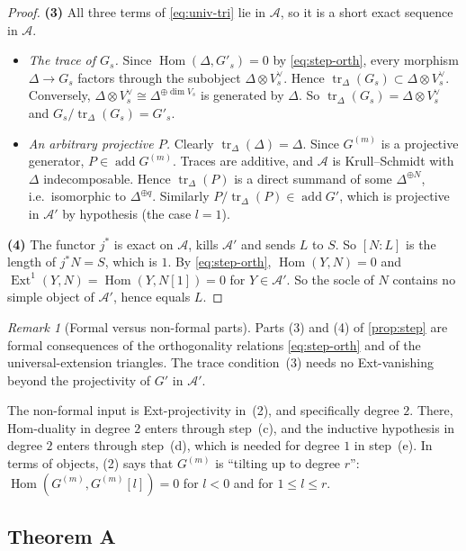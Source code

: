 \documentclass[11pt,reqno]{amsart}
\theoremstyle{plain}
\theoremstyle{definition}
\theoremstyle{remark}
\newtheorem{remark}[theorem]{Remark}
\DeclareMathOperator{\Hom}{Hom}
\DeclareMathOperator{\Ext}{Ext}
\DeclareMathOperator{\add}{add}
\DeclareMathOperator{\tr}{tr}
\newcommand{\cA}{\mathcal{A}}
\begin{document}
\begin{proof}
\textbf{(3)} All three terms of \eqref{eq:univ-tri} lie in $\cA$, so it is a short exact sequence in $\cA$.
\begin{itemize}
\item \emph{The trace of $G_s$.} Since $\Hom(\Delta,G'_s)=0$ by \eqref{eq:step-orth}, every morphism $\Delta\to G_s$ factors through the subobject $\Delta\otimes V_s^\vee$. Hence $\tr_\Delta(G_s)\subset\Delta\otimes V_s^\vee$. Conversely, $\Delta\otimes V_s^\vee\cong\Delta^{\oplus\dim V_s}$ is generated by $\Delta$. So $\tr_\Delta(G_s)=\Delta\otimes V_s^\vee$ and $G_s/\tr_\Delta(G_s)=G'_s$.
\item \emph{An arbitrary projective $P$.} Clearly $\tr_\Delta(\Delta)=\Delta$. Since $G^{(m)}$ is a projective generator, $P\in\add G^{(m)}$. Traces are additive, and $\cA$ is Krull--Schmidt with $\Delta$ indecomposable. Hence $\tr_\Delta(P)$ is a direct summand of some $\Delta^{\oplus N}$, i.e.\ isomorphic to $\Delta^{\oplus q}$. Similarly $P/\tr_\Delta(P)\in\add G'$, which is projective in $\cA'$ by hypothesis (the case $l=1$).
\end{itemize}

\textbf{(4)} The functor $j^*$ is exact on $\cA$, kills $\cA'$ and sends $L$ to $S$. So $[N:L]$ is the length of $j^*N=S$, which is $1$. By \eqref{eq:step-orth}, $\Hom(Y,N)=0$ and $\Ext^1(Y,N)=\Hom(Y,N[1])=0$ for $Y\in\cA'$. So the socle of $N$ contains no simple object of $\cA'$, hence equals $L$.
\end{proof}

\begin{remark}[Formal versus non-formal parts]\label{rem:step-formal}
Parts (3) and (4) of \cref{prop:step} are formal consequences of the orthogonality relations \eqref{eq:step-orth} and of the universal-extension triangles. The trace condition~(3) needs no Ext-vanishing beyond the projectivity of $G'$ in $\cA'$.

The non-formal input is Ext-projectivity in~(2), and specifically degree $2$. There, Hom-duality in degree $2$ enters through step~(c), and the inductive hypothesis in degree $2$ enters through step~(d), which is needed for degree $1$ in step~(e). In terms of objects, (2) says that $G^{(m)}$ is ``tilting up to degree $r$'': $\Hom(G^{(m)},G^{(m)}[l])=0$ for $l<0$ and for $1\le l\le r$.
\end{remark}

\subsection{Theorem A}
\end{document}
